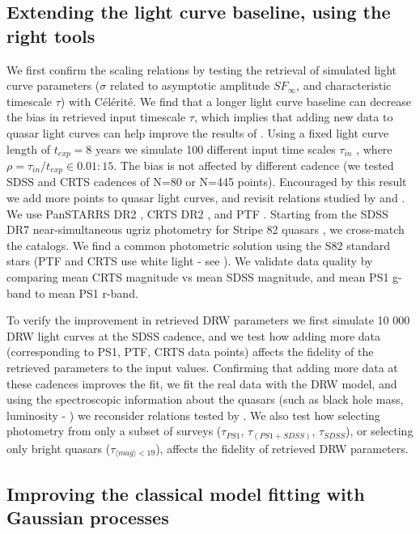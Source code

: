 \documentclass[modern]{aastex62}
\begin{document}
\subsection{Extending the light curve baseline, using the right tools}
We first confirm the \cite{kozlowski2017a} scaling relations by testing the retrieval of simulated light curve parameters ($\sigma$ related to asymptotic amplitude $SF_{\infty}$, and characteristic timescale $\tau$) with C\'el\'erit\'e.  We find that a longer light curve baseline can decrease the bias in retrieved input timescale $\tau$, which implies that adding new data to quasar light curves can help improve the results of \cite{macleod2011}.  Using a fixed light curve length of $t_{exp} = 8$ years we simulate 100 different input time scales $\tau_{in}$ ,  where  $\rho = \tau_{in} / t_{exp} \in   { 0.01 : 15}$.  The bias is not affected by different cadence (we tested SDSS and CRTS cadences of N=80 or N=445 points).
Encouraged by this result we add more points to quasar light curves, and revisit relations studied by  \cite{macleod2011} and \cite{hernitschek2016}. We use PanSTARRS \citep{chambers2011} DR2 \citep{flewelling2018}, CRTS DR2 \citep{drake2009}, and PTF \citep{rau2009}. Starting from the SDSS  DR7 near-simultaneous ugriz photometry for Stripe 82 quasars \citep{schneider2008}, we cross-match the catalogs. We find a common photometric solution using the S82 standard stars (PTF and CRTS use white light - see \cite{djorgovski2011a}). We validate data quality by comparing mean CRTS magnitude vs mean SDSS magnitude, and mean PS1 g-band to mean PS1 r-band. 

To verify the improvement in retrieved DRW parameters we first simulate 10 000 DRW light curves at the SDSS cadence, and we test how adding more data (corresponding to PS1, PTF, CRTS data points) affects the fidelity of the retrieved parameters to the input values. Confirming that adding more data at these cadences improves the fit, we fit the real data with the DRW model, and using the spectroscopic information about the quasars (such as black hole mass, luminosity - \cite{kelly2013}) we reconsider relations tested by \cite{macleod2011}.  We also test how selecting photometry from only a subset of surveys ($\tau_{PS1}$, $\tau_{(PS1+SDSS)}$,  $\tau_{SDSS}$), or selecting only bright quasars  ($\tau_{\langle mag\rangle<19}$), affects the fidelity of retrieved DRW parameters.

\subsection{Improving the classical model fitting with Gaussian processes}
\end{document}
